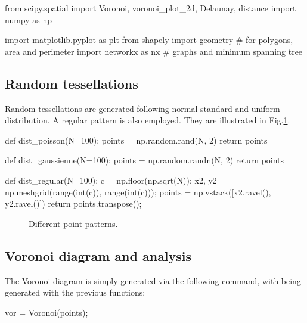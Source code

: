 \def\QRCODE{TB_IPR_TUT.IMG.point_processes_voronoi_pythonqrcode.png}
\def\QRPAGE{http://www.iptutorials.science/tree/master/TB_IPR/TUT.IMG.point_processes_voronoi/python}


\begin{python}
from scipy.spatial import Voronoi, voronoi_plot_2d, Delaunay, distance
import numpy as np

import matplotlib.pyplot as plt
from shapely import geometry # for polygons, area and perimeter
import networkx as nx # graphs and minimum spanning tree
\end{python}

\subsection{Random tessellations}
Random tessellations are generated following normal standard and uniform distribution. A regular pattern is also employed. They are illustrated in Fig.\ref{fig:point_processes_voronoi:python:patterns}.

\begin{python}
def dist_poisson(N=100):
    points = np.random.rand(N, 2)
    return points

def dist_gaussienne(N=100):
    points = np.random.randn(N, 2)
    return points

def dist_regular(N=100):
    c = np.floor(np.sqrt(N));
    x2, y2 = np.meshgrid(range(int(c)), range(int(c)));
    points = np.vstack([x2.ravel(), y2.ravel()])
    return points.transpose();
\end{python}

\begin{figure}[H]
 \centering\caption{Different point patterns.}%
 \hfill
 \hfill
 \label{fig:point_processes_voronoi:python:patterns}%
\end{figure}

\subsection{Voronoi diagram and analysis}

The Voronoi diagram is simply generated via the following command, with  being generated with the previous functions:
\begin{python}
vor = Voronoi(points);
\end{python}

